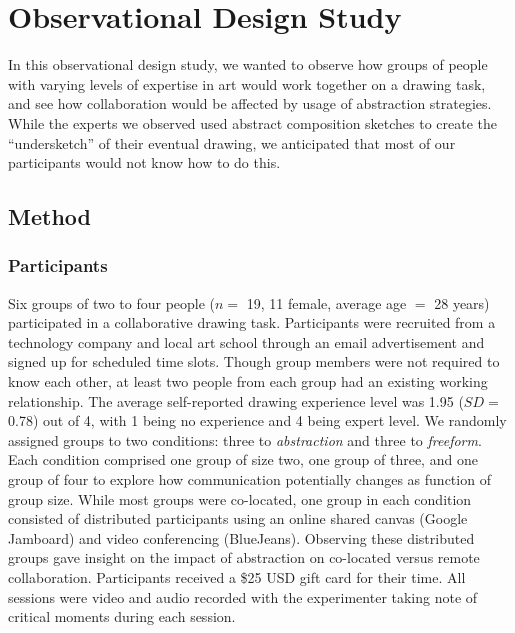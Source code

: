\section{Observational Design Study}
\label{sec:abs_study}
In this observational design study, we wanted to observe how groups of people with varying levels of expertise in art would work together on a drawing task, and see how collaboration would be affected by usage of abstraction strategies. While the experts we observed used abstract composition sketches to create the ``undersketch'' of their eventual drawing, we anticipated that most of our participants would not know how to do this. 

\subsection{Method}

\subsubsection{Participants}
Six groups of two to four people ($n=$ 19, 11 female, average age $=$ 28 years) participated in a collaborative drawing task. Participants were recruited from a technology company and local art school through an email advertisement and signed up for scheduled time slots. Though group members were not required to know each other, at least two people from each group had an existing working relationship. The average self-reported drawing experience level was 1.95 ($SD=$ 0.78) out of 4, with 1 being no experience and 4 being expert level. We randomly assigned groups to two conditions: three to \textit{abstraction} and three to \textit{freeform}. Each condition comprised one group of size two, one group of three, and one group of four to explore how communication potentially changes as function of group size. While most groups were co-located, one group in each condition consisted of distributed participants using an online shared canvas (Google Jamboard) and video conferencing (BlueJeans). Observing these distributed groups gave insight on the impact of abstraction on co-located versus remote collaboration. Participants received a \$25 USD gift card for their time. All sessions were video and audio recorded with the experimenter taking note of critical moments during each session.  

